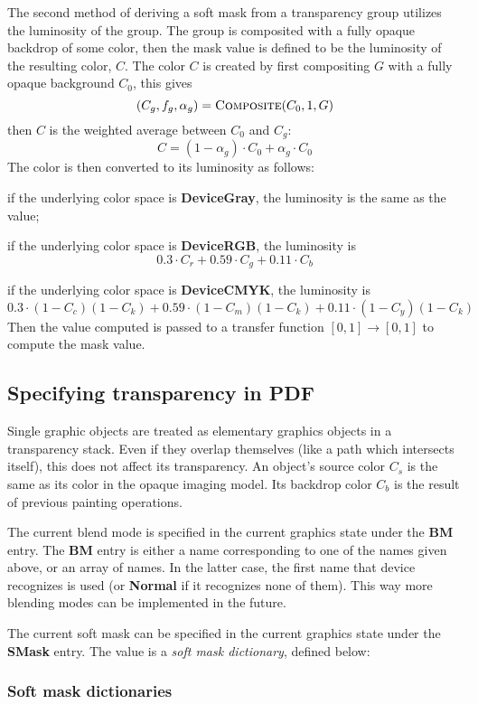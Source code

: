 The second method of deriving a soft mask from a transparency group utilizes the luminosity of the group.
The group is composited with a fully opaque backdrop of some color, then the mask value is defined to be the
luminosity of the resulting color, $C$.
The color $C$ is created by first compositing $G$ with a fully opaque background $C_0$, this gives
$$ (C_g,f_g,\alpha_g) = \hbox{\sc Composite}(C_0,1,G) $$
then $C$ is the weighted average between $C_0$ and $C_g$:
$$ C = (1-\alpha_g)\cdot C_0 + \alpha_g\cdot C_0 $$
The color is then converted to its luminosity as follows:
\blist
    \item if the underlying color space is {\bf DeviceGray}, the luminosity is the same as the value;
    \item if the underlying color space is {\bf DeviceRGB}, the luminosity is
        $$ 0.3\cdot C_r + 0.59\cdot C_g + 0.11\cdot C_b $$
    \item if the underlying color space is {\bf DeviceCMYK}, the luminosity is
        $$ 0.3\cdot(1-C_c)(1-C_k) + 0.59\cdot(1-C_m)(1-C_k) + 0.11\cdot(1-C_y)(1-C_k) $$
\elist
Then the value computed is passed to a transfer function $[0,1]\to[0,1]$ to compute the mask value.

\subsection{Specifying transparency in PDF}

Single graphic objects are treated as elementary graphics objects in a transparency stack.
Even if they overlap themselves (like a path which intersects itself), this does not affect its transparency.
An object's source color $C_s$ is the same as its color in the opaque imaging model.
Its backdrop color $C_b$ is the result of previous painting operations.

The current blend mode is specified in the current graphics state under the {\bf BM} entry.
The {\bf BM} entry is either a name corresponding to one of the names given above, or an array of names.
In the latter case, the first name that device recognizes is used (or {\bf Normal} if it recognizes none of
them).
This way more blending modes can be implemented in the future.

The current soft mask can be specified in the current graphics state under the {\bf SMask} entry.
The value is a {\it soft mask dictionary}, defined below:

\subsubsection{Soft mask dictionaries}

